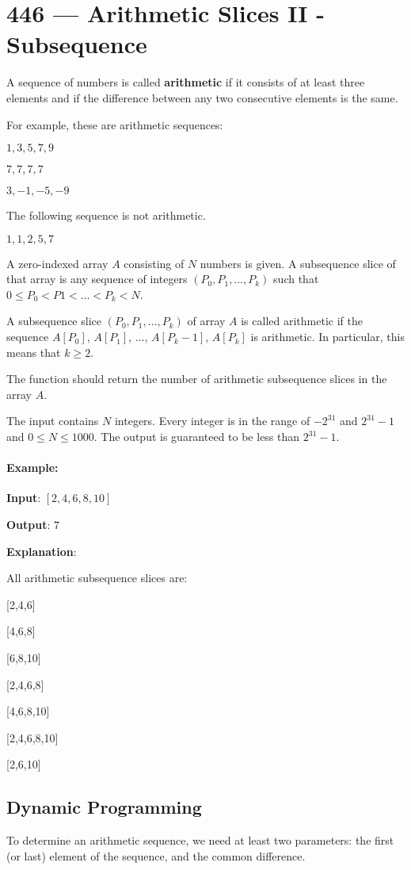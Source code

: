 \section{446 --- Arithmetic Slices II - Subsequence}
A sequence of numbers is called \textbf{arithmetic} if it consists of at least three elements and if the difference between any two consecutive elements is the same.

For example, these are arithmetic sequences:

$1, 3, 5, 7, 9$

$7, 7, 7, 7$

$3, -1, -5, -9$

The following sequence is not arithmetic.

$1, 1, 2, 5, 7$

A zero-indexed array $A$ consisting of $N$ numbers is given. A subsequence slice of that array is any sequence of integers $(P_0, P_1, \ldots, P_k)$ such that $0 \leq P_0 < P1 < \ldots < P_k < N$.

A subsequence slice $(P_0, P_1, \ldots, P_k)$ of array $A$ is called arithmetic if the sequence $A[P_0]$, $A[P_1]$, $\ldots$, $A[P_k-1]$, $A[P_k]$ is arithmetic. In particular, this means that $k \geq 2$.

The function should return the number of arithmetic subsequence slices in the array $A$.

The input contains $N$ integers. Every integer is in the range of $-2^{31}$ and $2^{31}-1$ and $0 \leq N \leq 1000$. The output is guaranteed to be less than $2^{31}-1$.
 

\paragraph{Example:}
\begin{flushleft}
\textbf{Input}: $[2, 4, 6, 8, 10]$

\textbf{Output}: 7

\textbf{Explanation}:

All arithmetic subsequence slices are:

[2,4,6]

[4,6,8]

[6,8,10]

[2,4,6,8]

[4,6,8,10]

[2,4,6,8,10]

[2,6,10]
\end{flushleft}


\subsection{Dynamic Programming}
To determine an arithmetic sequence, we need at least two parameters: the first (or last) element of the sequence, and the common difference.

